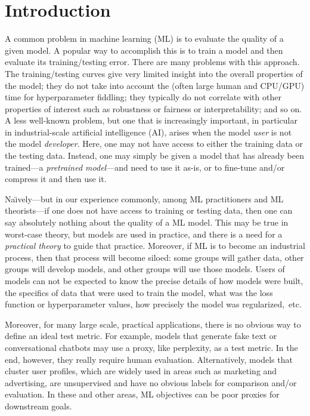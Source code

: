 \section{Introduction}
\label{sxn:intro}

A common problem in machine learning (ML) 
is to evaluate the quality of a given model.
A popular way to accomplish this
is to train a model and then evaluate its training/testing error.
There are many problems with this approach.
The training/testing curves give very limited insight into the overall properties of the model; 
they do not take into account the (often large human and CPU/GPU) time for hyperparameter fiddling;
they typically do not correlate with other properties of interest such as robustness or fairness or interpretability; 
and so on.
A less well-known problem, but one that is increasingly important, in particular in industrial-scale artificial intelligence (AI), arises when the model \emph{user} is not the model \emph{developer}.
Here, one may not have access to either the training data or the testing data.
Instead, one may simply be given a model that has already been trained---a \emph{pretrained model}---and need to use it as-is, or to fine-tune and/or compress it and then use it.

Na\"{\i}vely---but in our experience commonly, among ML practitioners and ML theorists---if one does not have access to training or testing data, then one can say absolutely nothing about the quality of a ML model.
This may be true in worst-case theory, but models are used in practice, and there is a need for a \emph{practical theory} to guide that practice.
Moreover, if ML is to become an industrial process, then that process will become siloed: some groups will gather data, other groups will develop models, and other groups will use those models.
Users of models can not be expected to know the precise details of how models were built, the specifics of data that were used to train the model, what was the loss function or hyperparameter values, how precisely the model was regularized,~etc.

Moreover, for many large scale, practical applications, there is no obvious way to define an ideal test metric. 
For example, models that generate fake text or conversational chatbots may use a proxy, like perplexity, as a test metric.
In the end, however, they really require human evaluation. 
Alternatively, models that cluster user profiles, which are widely used in areas such as marketing and advertising, are unsupervised and have no obvious labels for comparison and/or evaluation.
In these and other areas, ML objectives can be poor proxies for downstream goals.

